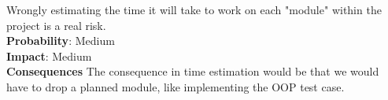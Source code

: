 Wrongly estimating the time it will take to work on each "module" within the project is a real risk.\\
\textbf{Probability}: Medium\\
\textbf{Impact}: Medium\\
\textbf{Consequences}
The consequence in time estimation would be that we would have to drop a planned module,
like implementing the OOP test case.